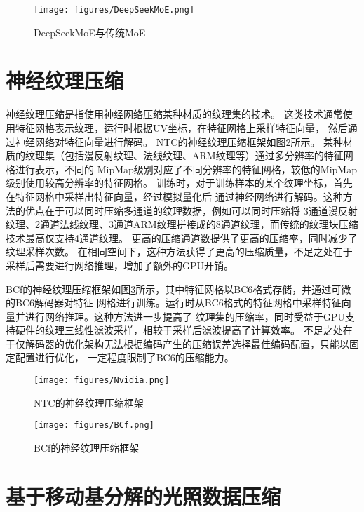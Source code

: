 \begin{figure}[htbp]
    \centering
    \texttt{[image: figures/DeepSeekMoE.png]}
    \caption{DeepSeekMoE与传统MoE\cite{dai2024deepseekmoe}}
    \label{fig:DeepSeekMoE}
\end{figure}

\section{神经纹理压缩}

神经纹理压缩是指使用神经网络压缩某种材质的纹理集的技术。
这类技术通常使用特征网格表示纹理，运行时根据UV坐标，在特征网格上采样特征向量，
然后通过神经网络对特征向量进行解码。
NTC\cite{vaidyanathan2023random}的神经纹理压缩框架如图\ref{fig:Nvidia}所示。
某种材质的纹理集（包括漫反射纹理、法线纹理、ARM纹理等）通过多分辨率的特征网格进行表示，不同的
MipMap级别对应了不同分辨率的特征网格，较低的MipMap级别使用较高分辨率的特征网格。
训练时，对于训练样本的某个纹理坐标，首先在特征网格中采样出特征向量，经过模拟量化后
通过神经网络进行解码。这种方法的优点在于可以同时压缩多通道的纹理数据，例如可以同时压缩将
3通道漫反射纹理、2通道法线纹理、3通道ARM纹理拼接成的8通道纹理，而传统的纹理块压缩技术最高仅支持4通道纹理。
更高的压缩通道数提供了更高的压缩率，同时减少了纹理采样次数。
在相同空间下，这种方法获得了更高的压缩质量，不足之处在于采样后需要进行网络推理，增加了额外的GPU开销。

BCf\cite{weinreich2024real}的神经纹理压缩框架如图\ref{fig:BCf}所示，其中特征网格以BC6格式存储，并通过可微的BC6解码器对特征
网格进行训练。运行时从BC6格式的特征网格中采样特征向量并进行网络推理。这种方法进一步提高了
纹理集的压缩率，同时受益于GPU支持硬件的纹理三线性滤波采样，相较于采样后滤波提高了计算效率。
不足之处在于仅解码器的优化架构无法根据编码产生的压缩误差选择最佳编码配置，只能以固定配置进行优化，
一定程度限制了BC6的压缩能力。

\begin{figure}[htbp]
    \centering
    \texttt{[image: figures/Nvidia.png]}
    \caption{NTC的神经纹理压缩框架\cite{vaidyanathan2023random}}
    \label{fig:Nvidia}
\end{figure}

\begin{figure}[htbp]
    \centering
    \texttt{[image: figures/BCf.png]}
    \caption{BCf的神经纹理压缩框架\cite{weinreich2024real}}
    \label{fig:BCf}
\end{figure}


\section{基于移动基分解的光照数据压缩}

